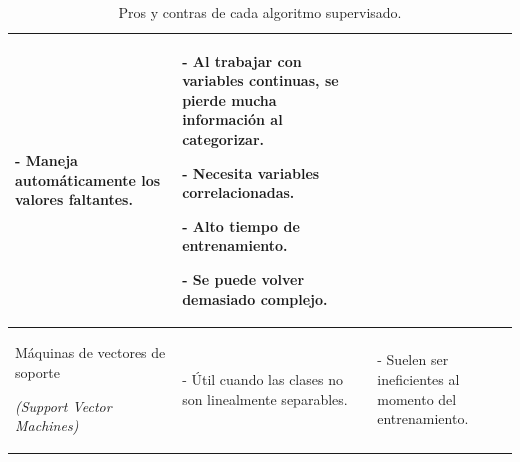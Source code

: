 \documentclass[a4paper,12pt]{article}
\begin{document}
\begin{landscape}
\begin{table}[]
\begin{tabularx}{\hsize}{|X|X|X|}
			- Maneja automáticamente los valores faltantes. & 
			- Al trabajar con variables continuas, se pierde mucha información al categorizar.
			
			- Necesita variables correlacionadas.
			
			- Alto tiempo de entrenamiento.
			
			- Se puede volver demasiado complejo.
			\\ \hline
			Máquinas de vectores de soporte 
			
			\textit{(Support Vector Machines)}  & 
			- Útil cuando las clases no son linealmente separables.
			& 
			- Suelen ser ineficientes al momento del entrenamiento.
			\\ \hline
		\end{tabularx}
		\caption{Pros y contras de cada algoritmo supervisado.}
		\label{tab:pro-cons-supervised}
	\end{table}
	
\end{landscape}

{}

%
%
\end{document}

